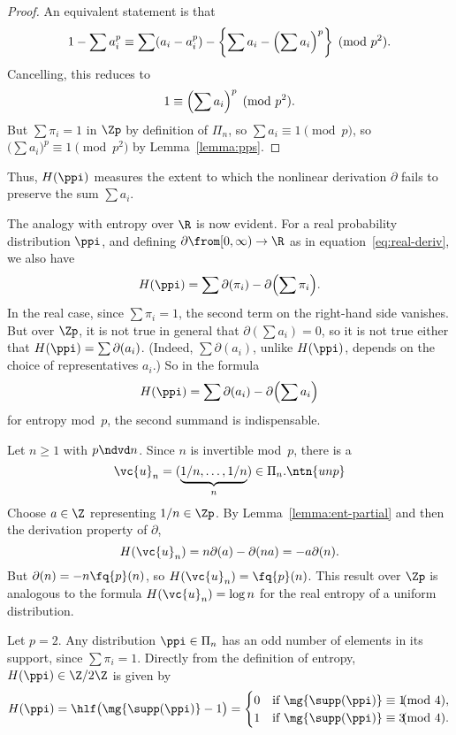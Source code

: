 \begin{proof}
An equivalent statement is that
\[
1 - \sum a_i^p
\equiv
\sum (a_i - a_i^p) - \biggl\{ \sum a_i - \Bigl( \sum a_i \Bigr)^p \biggr\}
\pmod{p^2}.
\]
Cancelling, this reduces to
\[
1 \equiv \Bigl( \sum a_i \Bigr)^p \pmod{p^2}.
\]
But $\sum \pi_i = 1$ in $\Zp$ by definition of $\Pi_n$, so $\sum a_i \equiv
1 \pmod{p}$, so $\bigl( \sum a_i \bigr)^p \equiv 1 \pmod{p^2}$ by
Lemma~\ref{lemma:pps}. 
\end{proof}

Thus, $H(\ppi)$ measures the extent to which the nonlinear derivation
$\partial$ fails to preserve the sum $\sum a_i$.

The analogy with entropy over $\R$ is now evident.  For a real probability
distribution $\ppi$, and defining $\partial \from [0, \infty) \to \R$ as
  in equation~\eqref{eq:real-deriv}, we also have
\[
H(\ppi) = \sum \partial(\pi_i) - \partial\Bigl(\sum \pi_i\Bigr).
\]
In the real case, since $\sum \pi_i = 1$, the second term on the right-hand
side vanishes.  But over $\Zp$,
it is not true in general that $\partial(\sum a_i) = 0$, so it is not true
either that $H(\ppi) = \sum \partial(a_i)$.  (Indeed, $\sum \partial(a_i)$,
unlike $H(\ppi)$, depends on the choice of representatives $a_i$.)
So in the formula
\[
H(\ppi) = \sum \partial(a_i) - \partial\Bigl(\sum a_i\Bigr)
\]
for entropy mod~$p$, the second summand is indispensable.

\begin{example}
Let $n \geq 1$ with $p \ndvd n$.  Since $n$ is invertible mod~$p$, there is
a 
\[
\vc{u}_n = (\underbrace{1/n, \ldots, 1/n}_n) \in \Pi_n.
\ntn{unp}
\]
Choose $a \in \Z$ representing $1/n \in \Zp$.  By
Lemma~\ref{lemma:ent-partial} and then the derivation property of
$\partial$, 
\[
H(\vc{u}_n)
=
n\partial(a) - \partial(na)
=
-a\partial(n).
\]
But $\partial(n) = -n\fq{p}(n)$, so $H(\vc{u}_n) = \fq{p}(n)$.  This result over
$\Zp$ is analogous to the formula $H(\vc{u}_n) = \log n$ for the real entropy
of a uniform distribution.
\end{example}

\begin{example}
Let $p = 2$.  Any distribution $\ppi \in \Pi_n$ has an odd
number of elements in its support, since $\sum \pi_i = 1$.  Directly from
the definition of entropy, $H(\ppi) \in \Z/2\Z$ is given by 
\[
H(\ppi) 
= 
\hlf\bigl(\mg{\supp(\ppi)} - 1\bigr) 
=
\begin{cases}
0       &\text{if } \mg{\supp(\ppi)} \equiv 1 \!\!\!\!\pmod{4}, \\
1       &\text{if } \mg{\supp(\ppi)} \equiv 3 \!\!\!\!\pmod{4}.
\end{cases}
\]
\end{example}

